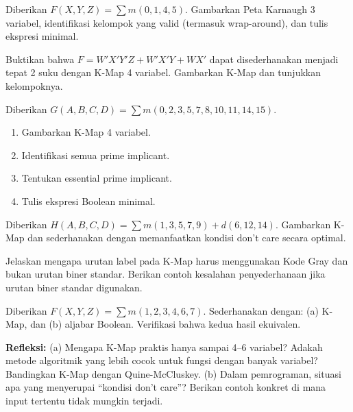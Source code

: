\documentclass[../main]{subfiles}
\begin{document}

\begin{latihan}
  \item Diberikan $F(X,Y,Z) = \sum m(0, 1, 4, 5)$. Gambarkan Peta Karnaugh 3 variabel, identifikasi kelompok yang valid (termasuk wrap-around), dan tulis ekspresi minimal.
  \item Buktikan bahwa $F = W'X'Y'Z + W'X'Y + WX'$ dapat disederhanakan menjadi tepat 2 suku dengan K-Map 4 variabel. Gambarkan K-Map dan tunjukkan kelompoknya.
  \item Diberikan $G(A,B,C,D) = \sum m(0, 2, 3, 5, 7, 8, 10, 11, 14, 15)$.
  \begin{enumerate}
    \item Gambarkan K-Map 4 variabel.
    \item Identifikasi semua prime implicant.
    \item Tentukan essential prime implicant.
    \item Tulis ekspresi Boolean minimal.
  \end{enumerate}
  \item Diberikan $H(A,B,C,D) = \sum m(1, 3, 5, 7, 9) + d(6, 12, 14)$. Gambarkan K-Map dan sederhanakan dengan memanfaatkan kondisi don't care secara optimal.
  \item Jelaskan mengapa urutan label pada K-Map harus menggunakan Kode Gray dan bukan urutan biner standar. Berikan contoh kesalahan penyederhanaan jika urutan biner standar digunakan.
  \item Diberikan $F(X,Y,Z) = \sum m(1, 2, 3, 4, 6, 7)$. Sederhanakan dengan: (a) K-Map, dan (b) aljabar Boolean. Verifikasi bahwa kedua hasil ekuivalen.
  \item \textbf{Refleksi:} (a) Mengapa K-Map praktis hanya sampai 4--6 variabel? Adakah metode algoritmik yang lebih cocok untuk fungsi dengan banyak variabel? Bandingkan K-Map dengan Quine-McCluskey. (b) Dalam pemrograman, situasi apa yang menyerupai ``kondisi don't care''? Berikan contoh konkret di mana input tertentu tidak mungkin terjadi.
\end{latihan}

\end{document}
